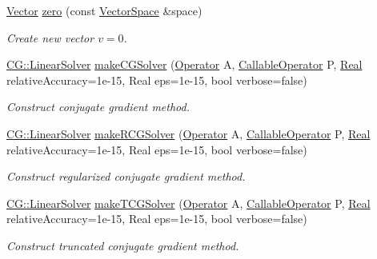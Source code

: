 \begin{DoxyCompactItemize}
\item 
\hypertarget{namespaceSpacy_ac7f0661bfdb52144b9ff0b9bbdd81f69}{\hyperlink{classSpacy_1_1Vector}{Vector} \hyperlink{namespaceSpacy_ac7f0661bfdb52144b9ff0b9bbdd81f69}{zero} (const \hyperlink{classSpacy_1_1VectorSpace}{Vector\-Space} \&space)}\label{namespaceSpacy_ac7f0661bfdb52144b9ff0b9bbdd81f69}

\begin{DoxyCompactList}\small\item\em Create new vector $v=0$. \end{DoxyCompactList}\item 
\hyperlink{classSpacy_1_1CG_1_1LinearSolver}{C\-G\-::\-Linear\-Solver} \hyperlink{namespaceSpacy_a158f06b6790d44613c6533fbd3822e6a}{make\-C\-G\-Solver} (\hyperlink{classSpacy_1_1Operator}{Operator} A, \hyperlink{namespaceSpacy_a022a87afa759e18781dd2aea9a80cd73}{Callable\-Operator} P, \hyperlink{classSpacy_1_1Real}{Real} relative\-Accuracy=1e-\/15, Real eps=1e-\/15, bool verbose=false)
\begin{DoxyCompactList}\small\item\em Construct conjugate gradient method. \end{DoxyCompactList}\item 
\hyperlink{classSpacy_1_1CG_1_1LinearSolver}{C\-G\-::\-Linear\-Solver} \hyperlink{namespaceSpacy_af70adbdd6fafbe87bd7c79be078851d6}{make\-R\-C\-G\-Solver} (\hyperlink{classSpacy_1_1Operator}{Operator} A, \hyperlink{namespaceSpacy_a022a87afa759e18781dd2aea9a80cd73}{Callable\-Operator} P, \hyperlink{classSpacy_1_1Real}{Real} relative\-Accuracy=1e-\/15, Real eps=1e-\/15, bool verbose=false)
\begin{DoxyCompactList}\small\item\em Construct regularized conjugate gradient method. \end{DoxyCompactList}\item 
\hyperlink{classSpacy_1_1CG_1_1LinearSolver}{C\-G\-::\-Linear\-Solver} \hyperlink{namespaceSpacy_a8c2664d93c0a0049cd3849a3a0c973a8}{make\-T\-C\-G\-Solver} (\hyperlink{classSpacy_1_1Operator}{Operator} A, \hyperlink{namespaceSpacy_a022a87afa759e18781dd2aea9a80cd73}{Callable\-Operator} P, \hyperlink{classSpacy_1_1Real}{Real} relative\-Accuracy=1e-\/15, Real eps=1e-\/15, bool verbose=false)
\begin{DoxyCompactList}\small\item\em Construct truncated conjugate gradient method. \end{DoxyCompactList}\item 

\end{DoxyCompactItemize}
